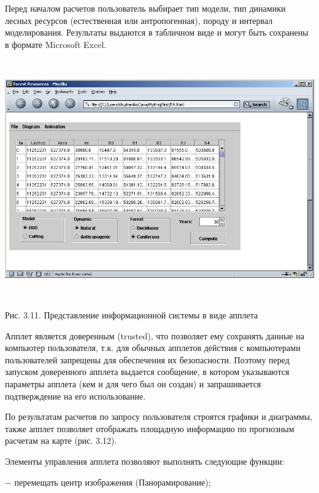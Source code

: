 \documentclass{article}
\begin{document}
Перед началом расчетов пользователь выбирает 
тип модели, тип динамики лесных ресурсов (естественная 
или антропогенная), породу и интервал моделирования. 
Результаты выдаются в табличном виде и могут 
быть сохранены в формате Microsoft Excel.

\includegraphics[width=454pt, height=291pt, keepaspectratio=true]{asyaDisser9_3-fig008.jpg}

\begin{center}
Рис. 3.11. Представление  информационной системы 
в виде апплета 
\end{center}

Апплет является доверенным (trusted), что позволяет 
ему сохранять данные на компьютер пользователя, 
т.к. для обычных апплетов действия с компьютерами 
пользователей запрещены для обеспечения их 
безопасности. Поэтому перед запуском доверенного 
апплета выдается сообщение, в котором указываются 
параметры апплета (кем и для чего был он создан) 
и запрашивается подтверждение на его использование.

По результатам расчетов по запросу пользователя 
строятся графики и диаграммы, также апплет 
позволяет отображать площадную информацию 
по прогнозным расчетам на карте (рис. 3.12). 

Элементы управления апплета позволяют выполнять 
следующие функции:

\ensuremath{-} перемещать центр изображения (Панорамирование);
\end{document}
